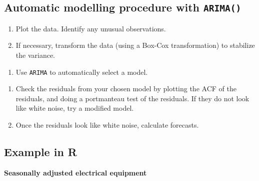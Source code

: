\documentclass[]{book}
\providecommand{\tightlist}{%
  \setlength{\itemsep}{0pt}\setlength{\parskip}{0pt}}
\begin{document}
\hypertarget{automatic-modelling-procedure-with-arima}{%
\subsection{\texorpdfstring{Automatic modelling procedure with \texttt{ARIMA()}}{Automatic modelling procedure with ARIMA()}}\label{automatic-modelling-procedure-with-arima}}

\begin{enumerate}
\def\labelenumi{\arabic{enumi}.}
\tightlist
\item
  Plot the data. Identify any unusual observations.
\item
  If necessary, transform the data (using a Box-Cox transformation) to stabilize the variance.
\end{enumerate}

\vspace*{0.15cm}

\begin{enumerate}
\def\labelenumi{\arabic{enumi}.}
\setcounter{enumi}{2}
\tightlist
\item
  Use \texttt{ARIMA} to automatically select a model.
\end{enumerate}

\vspace*{0.15cm}

\begin{enumerate}
\def\labelenumi{\arabic{enumi}.}
\setcounter{enumi}{5}
\tightlist
\item
  Check the residuals from your chosen model by plotting the ACF of the residuals, and doing a portmanteau test of the residuals. If they do not look like white noise, try a modified model.
\item
  Once the residuals look like white noise, calculate forecasts.
\end{enumerate}

\hypertarget{example-in-r}{%
\subsection{Example in R}\label{example-in-r}}

\textbf{Seasonally adjusted electrical equipment}
\end{document}
